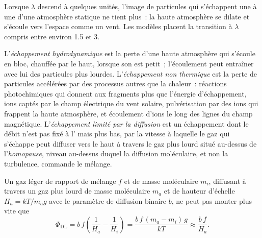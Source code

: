
Lorsque $\lambda$ descend à quelques unités, l'image de particules qui s'échappent une à une
d'une atmosphère statique ne tient plus~: la haute atmosphère se dilate et s'écoule
vers l'espace comme un vent. Les modèles placent la transition à $\lambda$ compris entre environ 1.5
et 3.

\begin{definition}\label{def:b3:planetary-atmospheres:hydrodynamic}
L'\emph{échappement hydrodynamique} est la perte d'une
haute atmosphère qui s'écoule en bloc, chauffée par le haut, lorsque son  est petit~; l'écoulement peut entraîner avec lui des particules plus lourdes.
L'\emph{échappement non thermique} est la perte
de particules accélérées par des processus autres que la chaleur~: réactions
photochimiques qui donnent aux fragments plus que l'énergie d'échappement, ions captés
par le champ électrique du vent solaire, pulvérisation par des ions qui frappent
la haute atmosphère, et écoulement d'ions le long des lignes du champ magnétique.
L'\emph{échappement limité par la diffusion} est un échappement
dont le débit n'est pas fixé à l' mais plus bas, par la vitesse à laquelle le gaz
qui s'échappe peut diffuser vers le haut à travers le gaz plus lourd situé au-dessus de
l'\emph{homopause}, niveau au-dessus duquel la diffusion moléculaire, et non la turbulence,
commande le mélange.
\end{definition}

\begin{proposition}\label{prop:b3:planetary-atmospheres:diffusion}
Un gaz léger de rapport de mélange $f$ et de masse moléculaire $m_i$, diffusant
à travers un gaz plus lourd de masse moléculaire $m_a$ et de hauteur d'échelle $H_a =
kT/m_a g$ avec le paramètre de diffusion binaire $b$, ne peut pas monter plus vite
que
\[
\Phi_\mathrm{DL} = b\,f\left(\frac1{H_a} - \frac1{H_i}\right)
= \frac{b\,f\,(m_a - m_i)\,g}{kT} \approx \frac{b\,f}{H_a}.
\]
\end{proposition}

